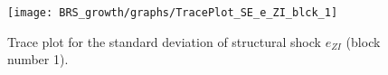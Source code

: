 \begin{figure}[H]
\centering
  \texttt{[image: BRS\_growth/graphs/TracePlot\_SE\_e\_ZI\_blck\_1]}\\
    \caption{Trace plot for the standard deviation of structural shock ${e_{ZI}}$ (block number 1).}
\end{figure}
